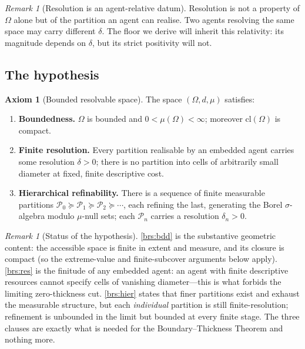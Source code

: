 \documentclass[11pt,a4paper]{article}
\theoremstyle{thmstyle}
\theoremstyle{definition}
\newtheorem{axiom}{Axiom}
\theoremstyle{remark}
\newtheorem{remark}[theorem]{Remark}
\newcommand{\Space}{\Omega}
\newcommand{\cl}{\mathrm{cl}}
\newcommand{\reso}{\delta}
\newcommand{\Part}{\mathscr{P}}
\begin{document}
\begin{remark}[Resolution is an agent-relative datum]
\label{rem:reso-relative}
Resolution is not a property of $\Space$ alone but of the partition an agent can
realise. Two agents resolving the same space may carry different $\reso$. The
floor we derive will inherit this relativity: its magnitude depends on $\reso$,
but its strict positivity will not.
\end{remark}

\subsection{The hypothesis}

\begin{axiom}[Bounded resolvable space]
\label{ax:brs}
The space $(\Space,d,\mu)$ satisfies:
\begin{enumerate}[label=\textup{(BRS\arabic*)},leftmargin=3.2em]
\item\label{brs:bdd} \textbf{Boundedness.} $\Space$ is bounded and
$0<\mu(\Space)<\infty$; moreover $\cl(\Space)$ is compact.
\item\label{brs:res} \textbf{Finite resolution.} Every partition realisable by
an embedded agent carries some resolution $\reso>0$; there is no partition into
cells of arbitrarily small diameter at fixed, finite descriptive cost.
\item\label{brs:hier} \textbf{Hierarchical refinability.} There is a sequence of
finite measurable partitions $\Part_0\succeq\Part_1\succeq\Part_2\succeq\cdots$,
each refining the last, generating the Borel $\sigma$-algebra modulo $\mu$-null
sets; each $\Part_n$ carries a resolution $\reso_n>0$.
\end{enumerate}
\end{axiom}

\begin{remark}[Status of the hypothesis]
\label{rem:brs-status}
\ref{brs:bdd} is the substantive geometric content: the accessible space is
finite in extent and measure, and its closure is compact (so the
extreme-value and finite-subcover arguments below apply). \ref{brs:res} is the
finitude of any embedded agent: an agent with finite descriptive resources
cannot specify cells of vanishing diameter---this is what forbids the limiting
zero-thickness cut. \ref{brs:hier} states that finer partitions exist and
exhaust the measurable structure, but each \emph{individual} partition is still
finite-resolution; refinement is unbounded in the limit but bounded at every
finite stage. The three clauses are exactly what is needed for the
Boundary--Thickness Theorem and nothing more.
\end{remark}
\end{document}
